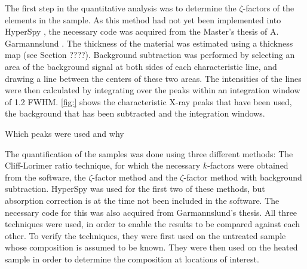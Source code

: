 The first step in the quantitative analysis was to determine the $\zeta$-factors of the elements in the sample. As this method had not yet been implemented into HyperSpy \cite{hyperspy}, the necessary code was acquired from the Master's thesis of A. Garmannslund \cite{andreas}. The thickness of the material was estimated using a thickness map (see Section ????). Background subtraction was performed by selecting an area of the background signal at both sides of each characteristic line, and drawing a line between the centers of these two areas. The intensities of the lines were then calculated by integrating over the peaks within an integration window of 1.2 FWHM. \cref{fig:} shows the characteristic X-ray peaks that have been used, the background that has been subtracted and the integration windows.

Which peaks were used and why

The quantification of the samples was done using three different methods: The Cliff-Lorimer ratio technique, for which the necessary $k$-factors were obtained from the software, the $\zeta$-factor method and the $\zeta$-factor method with background subtraction. HyperSpy was used for the first two of these methods, but absorption correction is at the time not been included in the software. The necessary code for this was also acquired from Garmannslund's thesis. All three techniques were used, in order to enable the results to be compared against each other. To verify the techniques, they were first used on the untreated sample whose composition is assumed to be known. They were then used on the heated sample in order to determine the composition at locations of interest.



